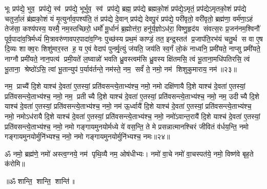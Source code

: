 भूः प्रप॑द्ये॒ भुव॒ प्रप॑द्ये॒ स्व॑ प्रप॑द्ये॒ भूर्भुव॒ स्व॑ प्रप॑द्ये॒ ब्रह्म॒ प्रप॑द्ये ब्रह्मको॒शं प्रप॑द्ये॒ऽमृतं॒ प्रप॑द्येऽमृतको॒शं प्रप॑द्ये चतुर्जा॒लं ब्र॑ह्मको॒शं यं मृ॒त्युर्नाव॒पश्य॑ति॒ तं प्रप॑द्ये दे॒वान् प्रप॑द्ये देवपु॒रं प्रप॑द्ये॒ परी॑वृतो॒ वरी॑वृतो॒ ब्रह्म॑णा॒ वर्म॑णा॒ऽहं तेज॑सा॒ कश्य॑पस्य॒ यस्मै॒ नम॒स्तच्छिरो॒ धर्मो॑ मू॒र्धानं॑ ब्र॒ह्मोत्त॑रा॒ हनु॑र्य॒ज्ञोऽध॑रा॒ विष्णु॒\ar{}हृद॑य संवत्स॒रः प्र॒जन॑नम॒श्विनौ॑ पूर्व॒पादा॑व॒त्रिर्मध्यं॑ मि॒त्रावरु॑णावपर॒पादा॑व॒ग्निः पुच्छ॑स्य प्रथ॒मं काण्डं॒ तत॒ इन्द्र॒स्तत॑ प्र॒जाप॑ति॒रभ॑यं चतु॒र्थ स वा ए॒ष दि॒व्यः शाक्व॒रः शिशु॑मार॒स्त ह॒ य ए॒वं वेदाप॑ पुनर्मृ॒त्युं ज॑यति॒ जय॑ति स्व॒र्गं लो॒कं नाध्वनि॒ प्रमी॑यते॒ नाप्सु प्रमी॑यते॒ नाग्नौ प्रमी॑यते॒ नान॒पत्य॑ प्रमी॒यते॑ ल॒घ्वान्नो॑ भवति ध्रु॒वस्त्वम॑सि ध्रु॒वस्य क्षि॑तमसि॒ त्वं भू॒ताना॒मधि॑पतिरसि॒ त्वं भू॒ताना॒ श्रेष्ठो॑ऽसि॒ त्वां भू॒तान्युप॑ प॒र्याव॑र्तन्ते॒ नम॑स्ते॒ नम॒ सर्वं॑ ते॒ नमो॒ नम॑ शिशुकुमाराय॒ नम॑॥२३॥
\anuvakamend

नम॒ प्राच्यै॑ दि॒शे याश्च॑ दे॒वता॑ ए॒तस्यां॒ प्रति॑वसन्त्ये॒ताभ्य॑श्च॒  नमो॒ नमो दक्षि॑णायै दि॒शे याश्च॑ दे॒वता॑ ए॒तस्यां॒ प्रति॑वसन्त्ये॒ताभ्य॑श्च॒  नमो॒ नम॒ प्रतीच्यै दि॒शे याश्च॑ दे॒वता॑ ए॒तस्यां॒ प्रति॑वसन्त्ये॒ताभ्य॑श्च॒  नमो॒ नम॒ उदीच्यै दि॒शे याश्च॑ दे॒वता॑ ए॒तस्यां॒ प्रति॑वसन्त्ये॒ताभ्य॑श्च॒  नमो॒ नम॑ ऊ॒र्ध्वायै॑ दि॒शे याश्च॑ दे॒वता॑ ए॒तस्यां॒ प्रति॑वसन्त्ये॒ताभ्य॑श्च॒  नमो॒ नमोऽध॑रायै दि॒शे याश्च॑ दे॒वता॑ ए॒तस्यां॒ प्रति॑वसन्त्ये॒ताभ्य॑श्च॒  नमो॒ नमो॑ऽवान्त॒रायै॑ दि॒शे याश्च॑ दे॒वता॑ ए॒तस्यां॒ प्रति॑वसन्त्ये॒ताभ्य॑श्च॒  नमो॒ नमो गङ्गायमुनयोर्मध्ये ये॑ वस॒न्ति॒ ते मे प्रसन्नात्मानश्चिरं जीवितं व॑र्धय॒न्ति॒ नमो गङ्गायमुनयोर्मुनि॑भ्यश्च॒ नमो॒ नमो गङ्गायमुनयोर्मुनि॑भ्यश्च॒ नमः॥२४॥
\anuvakamend

ॐ नमो॒ ब्रह्म॑णे॒ नमो॑ अस्त्व॒ग्नये॒ नम॑ पृथि॒व्यै नम॒ ओष॑धीभ्यः। नमो॑ वा॒चे नमो॑ वा॒चस्पत॑ये॒ नमो॒ विष्ण॑वे बृह॒ते क॑रोमि॥\\
\centerline{॥ॐ शान्ति॒ शान्ति॒ शान्ति॑॥}
